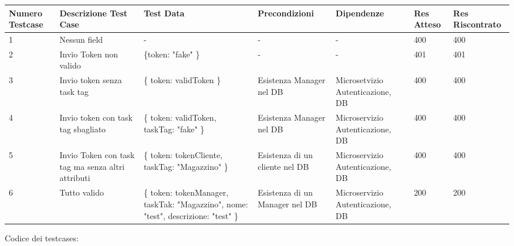 \documentclass{report}
\begin{document}
\begin{center} %
	\centering
	\begin{tabular}{ |p{1cm}|p{2cm}|p{2cm}|p{2cm}|p{2cm}|p{1cm}|p{1cm}| }
		\hline
		Numero Testcase & Descrizione Test Case                             & Test Data                                                                          & Precondizioni                  & Dipendenze                       & Res Atteso & Res Riscontrato \\
		\hline
		1               & Nessun field                                      & -                                                                                  & -                              & -                                & 400        & 400             \\
		\hline
		2               & Invio Token non valido                            & \{token: "fake" \}                                                                 & -                              & -                                & 401        & 401             \\
		\hline
		3               & Invio token senza task tag                        & \{ token: validToken \}                                                            & Esistenza Manager nel DB       & Microsetvizio Autenticazione, DB & 400        & 400             \\
		4               & Invio token con task tag sbagliato                & \{ token: validToken, taskTag: "fake" \}                                           & Esistenza Manager nel DB       & Microservizio Autenticazione, DB & 400        & 400             \\
		5               & Invio Token con task tag ma senza altri attributi & \{ token: tokenCliente, taskTag: "Magazzino" \}                                    & Esistenza di un cliente nel DB & Microservizio Autenticazione, DB & 400        & 400             \\
		\hline
		6               & Tutto valido                                      & \{ token: tokenManager, taskTak: "Magazzino", nome: "test", descrizione: "test" \} & Esistenza di un Manager nel DB & Microservizio Autenticazione, DB & 200        & 200             \\
		\hline
	\end{tabular}
\end{center}

Codice dei testcases:
\end{document}
